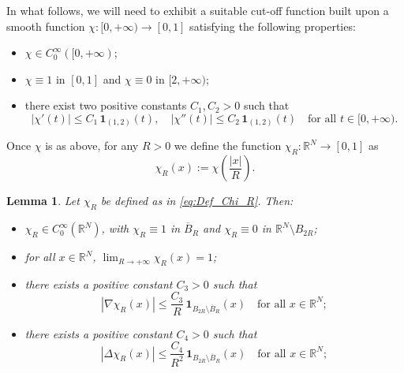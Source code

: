 \documentclass[11pt,a4paper,reqno]{amsart}
\theoremstyle{definition}
\theoremstyle{plain}
\newtheorem{lemma}[definition]{Lemma}
\numberwithin{equation}{section}
\begin{document}
In what follows, we will need to exhibit a suitable cut-off function built upon a smooth function $\chi:[0,+\infty)\to [0,1]$ satisfying the following properties:
\begin{itemize}
	\item[i)]  $\chi \in C^{\infty}_{0}([0,+\infty)$;
	\item[ii)] $\chi \equiv 1$ in $[0,1]$ and $\chi \equiv 0$ in $[2,+\infty)$;
	\item[iii)] there exist two positive constants $C_1,C_2>0$ such that
	$$|\chi'(t)| \leq C_1 \,  \mathbf{1}_{(1,2)}(t), \quad |\chi''(t)|\leq C_{2} \, \mathbf{1}_{(1,2)}(t) \quad \textrm{for all } t \in [0,+\infty).$$
\end{itemize}
Once $\chi$ is as above, for any $R>0$ we define the function $\chi_{R}:\mathbb{R}^N \to [0,1]$ as
\begin{equation}\label{eq:Def_Chi_R}
	\chi_{R}(x):= \chi \left(\dfrac{|x|}{R}\right).
\end{equation}	

\begin{lemma}\label{lem:chiR}
	Let $\chi_{R}$ be defined as in \eqref{eq:Def_Chi_R}. Then:
	\begin{itemize}
		\item[a)] $\chi_{R}\in C^{\infty}_{0}(\mathbb{R}^{N})$, with $\chi_{R}\equiv 1$ in $\overline{B}_{R}$ and $\chi_{R}\equiv 0$ in $\mathbb{R}^{N} \setminus B_{2R}$;
		\item[b)] for all $x\in \mathbb{R}^{N}$, $\lim_{R \to +\infty}\chi_{R}(x)=1$;
		\item[c)] there exists a positive constant $C_3>0$ such that
		\begin{equation}\label{eq:stima_grad_chiR}
			|\nabla \chi_{R}(x)| \leq \dfrac{C_3}{R} \, \mathbf{1}_{B_{2R}\setminus \overline{B}_{R}}(x) \quad \textrm{for all } x \in \mathbb{R}^{N};
		\end{equation}	
		\item[d)] there exists a positive constant $C_4>0$ such that
		\begin{equation}
			|\Delta \chi_R(x)| \leq \dfrac{C_4}{R^2} \, \mathbf{1}_{B_{2R}\setminus \overline{B}_{R}}(x) \quad \textrm{for all } x \in \mathbb{R}^{N};
		\end{equation}
	\end{itemize}
\end{lemma}
\end{document}
